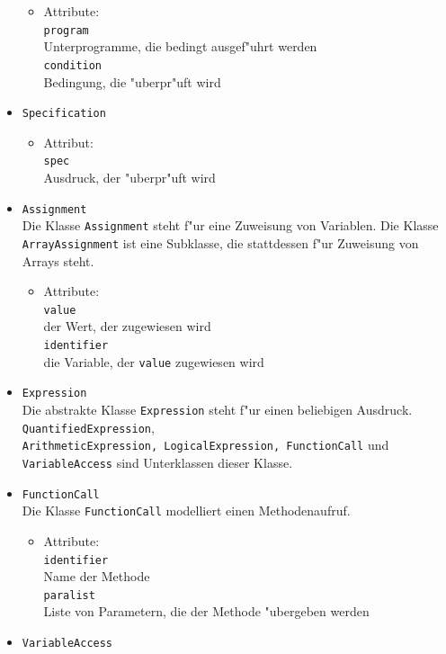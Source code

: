 \documentclass[10pt,a4paper,titlepage]{article}
\begin{document}
\begin{itemize}
\begin{itemize}
\item Attribute: \\
\texttt{program} \\
Unterprogramme, die bedingt ausgef"uhrt werden \\
\texttt{condition} \\
Bedingung, die "uberpr"uft wird
\end{itemize}
\item \texttt{Specification}
\begin{itemize}
\item Attribut: \\
\texttt{spec} \\
Ausdruck, der "uberpr"uft wird
\end{itemize}
\item \texttt{Assignment} \\
Die Klasse \texttt{Assignment} steht f"ur eine Zuweisung von Variablen. Die Klasse \texttt{ArrayAssignment} ist eine Subklasse, die stattdessen f"ur Zuweisung von Arrays steht.
\begin{itemize}
\item Attribute: \\
\texttt{value} \\
der Wert, der zugewiesen wird\\
\texttt{identifier} \\
die Variable, der \texttt{value} zugewiesen wird
\end{itemize}
\item \texttt{Expression} \\
Die abstrakte Klasse \texttt{Expression} steht f"ur einen beliebigen Ausdruck. \texttt{QuantifiedExpression}, \\
\texttt{ArithmeticExpression, LogicalExpression, FunctionCall} und \texttt{VariableAccess} sind Unterklassen dieser Klasse.
\item \texttt{FunctionCall} \\
Die Klasse \texttt{FunctionCall} modelliert einen Methodenaufruf. 
\begin{itemize}
\item Attribute: \\
\texttt{identifier} \\
Name der Methode \\
\texttt{paralist} \\
Liste von Parametern, die der Methode "ubergeben werden
\end{itemize}
\item \texttt{VariableAccess} \\

\end{itemize}
\end{document}
